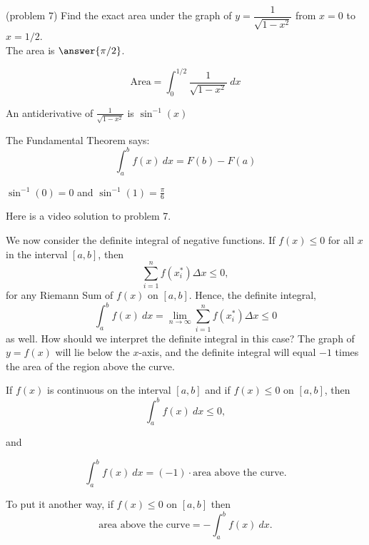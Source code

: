 \documentclass[handout]{ximera}
\begin{document}
\begin{problem}(problem 7)
Find the exact area under the graph of $y = \dfrac{1}{\sqrt{1-x^2}}$ from $x = 0$ to $x = 1/2$.\\
The area is $\answer{\pi/2}$.
 \begin{hint}
  \[
  \text{Area} =  \int_0^{1/2} \frac{1}{\sqrt{1-x^2}} \ dx
  \]
 \end{hint} 
    \begin{hint}
      An antiderivative of $\frac{1}{\sqrt{1-x^2}}$ is $\sin^{-1}(x)$
    \end{hint}
    
    \begin{hint}
      The Fundamental Theorem says:
      \[
      \int_a^b f(x) \ dx = F(b) - F(a)
      \]
    \end{hint}    
		\begin{hint}
      $\sin^{-1}(0) = 0$ and $\sin^{-1}(1) = \frac{\pi}{6}$ 
    \end{hint}
		
		
\end{problem}

Here is a video solution to problem 7.
\begin{foldable}
\end{foldable}

We now consider the definite integral of negative functions.
If $f(x) \leq 0$ for all $x$ in the interval $[a,b]$, then 
\[\sum_{i=1}^n f(x_i^*) \Delta x \leq 0,\]
for any Riemann Sum of $f(x)$ on $[a, b]$.
Hence, the definite integral,
\[
\int_a^b f(x) \ dx = \lim_{n \to \infty} \sum_{i=1}^n f(x_i^*) \Delta x \leq 0
\]
as well. How should we interpret the definite integral in this case? The graph of $y = f(x)$ will lie below the $x$-axis, 
and the definite integral will equal $-1$ times the area of the region above the curve. 

\begin{proposition}
If $f(x)$ is continuous on the interval $[a, b]$ and if $f(x) \leq 0$ on $[a,b]$,
then 
\[ \int_a^b f(x) \ dx \leq 0,\]

and 

\[\int_a^b f(x) \ dx = (-1) \cdot \text{area above the curve}.\]
\end{proposition}

To put it another way, if $f(x) \leq 0$ on $[a,b]$ then
\[\text{area above the curve} = -\int_a^b f(x) \ dx.\]
\end{document}
